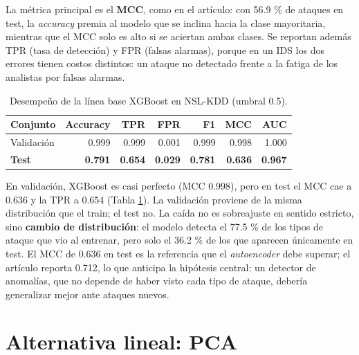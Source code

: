 \documentclass[
  spanish,
  11pt,
]{article}
\begin{document}
La métrica principal es el \textbf{MCC}, como en el artículo: con 56.9 \% de ataques en test, la \emph{accuracy}
premia al modelo que se inclina hacia la clase mayoritaria, mientras que el MCC solo es alto si se
aciertan ambas clases. Se reportan además TPR (tasa de detección) y FPR (falsas alarmas), porque en un
IDS los dos errores tienen costos distintos: un ataque no detectado frente a la fatiga de los
analistas por falsas alarmas.

\begin{table}[!h]
\centering
\caption{\label{tab:xgb-tabla}Desempeño de la línea base XGBoost en NSL-KDD (umbral 0.5).}
\centering
\fontsize{9}{11}\selectfont
\begin{tabular}[t]{lrrrrrr}
\toprule
Conjunto & Accuracy & TPR & FPR & F1 & MCC & AUC\\
\midrule
Validación & 0.999 & 0.999 & 0.001 & 0.999 & 0.998 & 1.000\\
\textbf{Test} & \textbf{0.791} & \textbf{0.654} & \textbf{0.029} & \textbf{0.781} & \textbf{0.636} & \textbf{0.967}\\
\bottomrule
\end{tabular}
\end{table}

En validación, XGBoost es casi perfecto (MCC 0.998), pero en test el MCC cae a 0.636 y la TPR a 0.654
(Tabla \ref{tab:xgb-tabla}). La validación proviene de la misma
distribución que el train; el test no. La caída no es sobreajuste en sentido estricto, sino \textbf{cambio
de distribución}: el modelo detecta el 77.5 \% de los tipos de ataque que vio al entrenar, pero solo
el 36.2 \% de los que aparecen únicamente en test.
El MCC de 0.636 en test es la referencia
que el \emph{autoencoder} debe superar; el artículo reporta 0.712, lo que anticipa la hipótesis central: un
detector de anomalías, que no depende de haber visto cada tipo de ataque, debería generalizar mejor
ante ataques nuevos.

\section{Alternativa lineal: PCA}\label{sec:pca}
\end{document}
